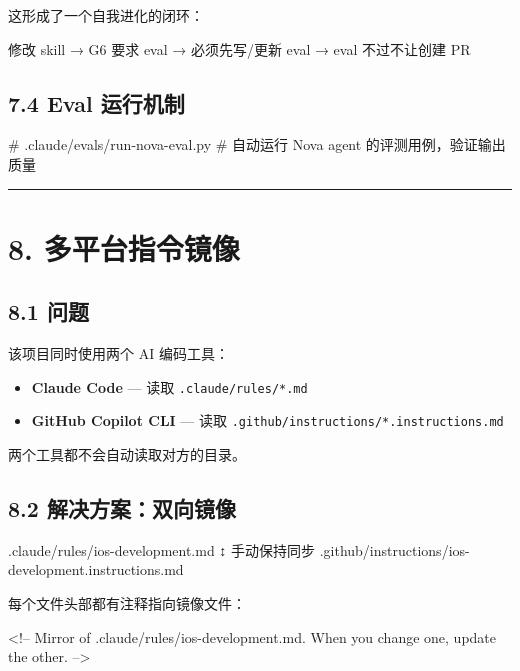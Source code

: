 这形成了一个自我进化的闭环：

\begin{codeblock}
修改 skill → G6 要求 eval → 必须先写/更新 eval → eval 不过不让创建 PR
\end{codeblock}

\subsection{7.4 Eval 运行机制}

\begin{codeblock}
# .claude/evals/run-nova-eval.py
# 自动运行 Nova agent 的评测用例，验证输出质量
\end{codeblock}

\bigskip\hrule\bigskip

\section{8. 多平台指令镜像}

\subsection{8.1 问题}

该项目同时使用两个 AI 编码工具：

\begin{itemize}[leftmargin=2em]
\item \textbf{Claude Code} --- 读取 \texttt{.claude/rules/*.md}
\item \textbf{GitHub Copilot CLI} --- 读取 \texttt{.github/instructions/*.instructions.md}
\end{itemize}

两个工具都不会自动读取对方的目录。


\subsection{8.2 解决方案：双向镜像}

\begin{codeblock}
.claude/rules/ios-development.md
    ↕ 手动保持同步
.github/instructions/ios-development.instructions.md
\end{codeblock}

每个文件头部都有注释指向镜像文件：


\begin{codeblock}
<!-- Mirror of .claude/rules/ios-development.md. When you change one, update the other. -->
\end{codeblock}

